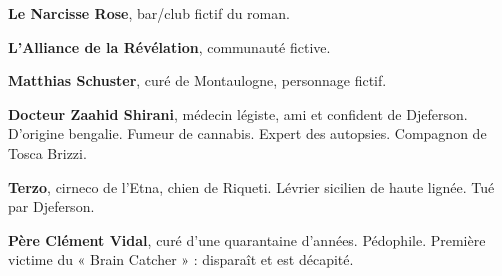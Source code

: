 \textbf{Le Narcisse Rose}, bar/club fictif du roman.

\textbf{L'Alliance de la Révélation}, communauté fictive.

\textbf{Matthias Schuster}, curé de Montaulogne, personnage fictif.

\textbf{Docteur Zaahid Shirani}, médecin légiste, ami et confident de Djeferson. D'origine bengalie. Fumeur de cannabis. Expert des autopsies. Compagnon de Tosca Brizzi.

\textbf{Terzo}, cirneco de l'Etna, chien de Riqueti. Lévrier sicilien de haute lignée. Tué par Djeferson.

\textbf{Père Clément Vidal}, curé d'une quarantaine d'années. Pédophile. Première victime du « Brain Catcher » : disparaît et est décapité.
